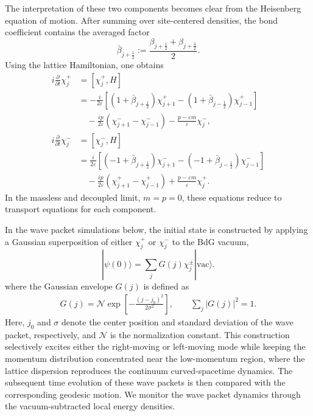 \documentclass[reprint,amsmath,amssymb,aps,prb]{revtex4-2}
\begin{document}
The interpretation of these two components becomes clear from the Heisenberg equation of motion.
After summing over site-centered densities, the bond coefficient contains the averaged factor
\begin{equation}
    \bar{\beta}_{j+\frac{1}{2}}
    :=
    \frac{\beta_{j+\frac{1}{2}}+\beta_{j+\frac{3}{2}}}{2}.
\end{equation}
Using the lattice Hamiltonian, one obtains
\begin{align}
i\frac{\partial}{\partial t}\chi_j^+
&=
[\chi_j^+,H]
\nonumber\\
&=
-\frac{i}{2\varepsilon}
\left[
(1+\bar{\beta}_{j+\frac{1}{2}})\chi_{j+1}^+
-
(1+\bar{\beta}_{j-\frac{1}{2}})\chi_{j-1}^+
\right]
\nonumber\\
&\quad
-
\frac{i p}{2\varepsilon}
\left(
\chi_{j+1}^-
-
\chi_{j-1}^-
\right)
-
\frac{p-\varepsilon m}{\varepsilon}\chi_j^-,
\nonumber\\
i\frac{\partial}{\partial t}\chi_j^-
&=
[\chi_j^-,H]
\nonumber\\
&=
\frac{i}{2\varepsilon}
\left[
(-1+\bar{\beta}_{j+\frac{1}{2}})\chi_{j+1}^-
-
(-1+\bar{\beta}_{j-\frac{1}{2}})\chi_{j-1}^-
\right]
\nonumber\\
&\quad
-
\frac{i p}{2\varepsilon}
\left(
\chi_{j+1}^+
-
\chi_{j-1}^+
\right)
+
\frac{p-\varepsilon m}{\varepsilon}\chi_j^+ .
\label{eq:chi_eom_lattice}
\end{align}
In the massless and decoupled limit, $m=p=0$, these equations reduce to transport equations for each component.

In the wave packet simulations below, the initial state is constructed by applying a Gaussian superposition of either $\chi_j^+$ or $\chi_j^-$ to the BdG vacuum,
\begin{equation}
|\psi(0)\rangle
=
\sum_j G(j)\chi_j^\pm |\mathrm{vac}\rangle .
\label{eq:initial_state_chi}
\end{equation}
where the Gaussian envelope $G(j)$ is defined as
\begin{align}
G(j) = \mathcal{N}
\exp\!\left[-\frac{(j - j_{0})^{2}}{2\sigma^{2}}\right],
\qquad
\sum_{j}|G(j)|^2=1.
\label{eq:gaussian}
\end{align}
Here, $j_{0}$ and $\sigma$ denote the center position and standard deviation of the wave packet, respectively, and $\mathcal{N}$ is the normalization constant. This construction selectively excites either the right-moving or left-moving mode while keeping the momentum distribution concentrated near the low-momentum region, where the lattice dispersion reproduces the continuum curved-spacetime dynamics. The subsequent time evolution of these wave packets is then compared with the corresponding geodesic motion.
We monitor the wave packet dynamics through the vacuum-subtracted local energy densities.
\end{document}
